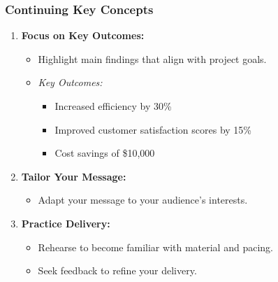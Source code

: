 \documentclass[aspectratio=169]{beamer}
\begin{document}
\begin{frame}[fragile]
    \frametitle{Continuing Key Concepts}
    \begin{enumerate}[resume]
        \item \textbf{Focus on Key Outcomes:}
            \begin{itemize}
                \item Highlight main findings that align with project goals.
                \item \textit{Key Outcomes:} 
                \begin{itemize}
                    \item Increased efficiency by 30\%
                    \item Improved customer satisfaction scores by 15\%
                    \item Cost savings of \$10,000
                \end{itemize}
            \end{itemize}
        \item \textbf{Tailor Your Message:}
            \begin{itemize}
                \item Adapt your message to your audience's interests.
            \end{itemize}
        \item \textbf{Practice Delivery:}
            \begin{itemize}
                \item Rehearse to become familiar with material and pacing.
                \item Seek feedback to refine your delivery.
            \end{itemize}
    \end{enumerate}
\end{frame}
\end{document}
